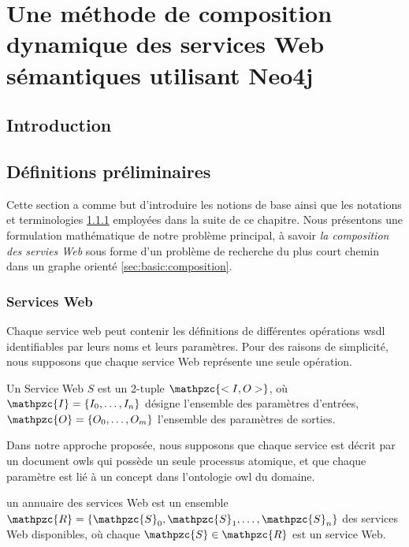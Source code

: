 \chapter{Une méthode de composition dynamique des services Web
  sémantiques utilisant Neo4j}
\label{ch:approach}

\section*{Introduction}
 

\newpage
\section{Définitions préliminaires}
\label{sec:basic-defs}
Cette section a comme but d'introduire les notions de base ainsi que
les notations et terminologies \ref{sec:basic:ws} employées dans la
suite de ce chapitre. Nous présentons une formulation
mathématique de notre problème principal, à savoir \textit{la
  composition des servies Web} sous forme d'un problème de recherche
du plus court chemin dans un graphe orienté
\ref{sec:basic:composition}.\medskip

\subsection{Services Web}
\label{sec:basic:ws}

Chaque service web peut contenir les définitions de différentes
opérations \acrshort{wsdl} identifiables par leurs noms et leurs
paramètres. Pour des raisons de simplicité, nous supposons que chaque
service Web représente une seule opération.\medskip

\begin{mydef}
  Un Service Web $S$ est un 2-tuple $\mathpzc{<I,O>}$, où
  $\mathpzc{I}=\{I_0, \dots, I_n\}$ désigne l'ensemble des paramètres
  d'entrées, $\mathpzc{O}=\{O_0, \dots, O_m\}$ l'ensemble des
  paramètres de sorties.
\end{mydef}



Dans notre approche proposée, nous supposons que chaque service est
décrit par un document \acrshort{owls} qui possède un seule processus
atomique, et que chaque paramètre est lié à un concept dans
l'ontologie \acrshort{owl} du domaine.\medskip

\begin{mydef}
  un annuaire des services Web est un ensemble
  $\mathpzc{R} =\{\mathpzc{S}_0, \mathpzc{S}_1, \dots,\mathpzc{S}_n\}$
  des services Web disponibles, où chaque
  $\mathpzc{S} \in \mathpzc{R}$ est un service Web.
\end{mydef}

